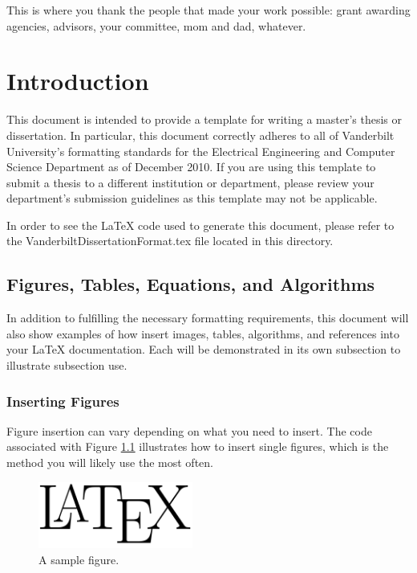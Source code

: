 \documentclass[10pt]{report}  %
\begin{document}
This is where you thank the people that made your work possible: grant awarding agencies, advisors, your committee, mom and dad, whatever.


\singlespacing
\tableofcontents

\begingroup
\setlength{\parskip}{1\baselineskip}
\listoftables
\newpage
\listoffigures
\newpage
\printnomenclature
\newpage
\endgroup

\normalsize
\doublespacing
{}
\setcounter{page}{1}
\chapter{Introduction}
	This document is intended to provide a template for writing a master's thesis or dissertation. In particular, this document correctly adheres to all of Vanderbilt University's formatting standards for the Electrical Engineering and Computer Science Department as of December 2010. If you are using this template to submit a thesis to a different institution or department, please review your department's submission guidelines as this template may not be applicable.
	
	In order to see the LaTeX code used to generate this document, please refer to the VanderbiltDissertationFormat.tex file located in this directory. 
	
\section{Figures, Tables, Equations, and Algorithms}
	In addition to fulfilling the necessary formatting requirements, this document will also show examples of how insert images, tables, algorithms, and references into your LaTeX documentation. Each will be demonstrated in its own subsection to illustrate subsection use.

\subsection{Inserting Figures}
Figure insertion can vary depending on what you need to insert. The code associated with Figure \ref{fig:texlogo} illustrates how to insert single figures, which is the method you will likely use the most often. 

\begin{figure}
\centering
\includegraphics[width=2in]{latex_logo.png}
\caption{A sample figure.}
\label{fig:texlogo}
\end{figure}
\end{document}

